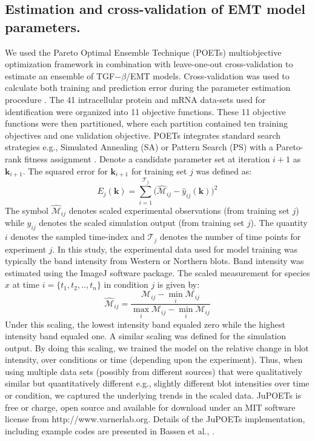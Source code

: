 \subsection*{Estimation and cross-validation of EMT model parameters.}
We used the Pareto Optimal Ensemble Technique (POETs) multiobjective optimization framework in combination with leave-one-out cross-validation to estimate an ensemble of TGF$-\beta$/EMT models.
Cross-validation was used to calculate both training and prediction error during the parameter estimation procedure \cite{kohavi1995study}.
The 41 intracellular protein and mRNA data-sets used for identification were organized into 11 objective functions.
These 11 objective functions were then partitioned, where each partition contained ten training objectives and one validation objective.
POETs integrates standard search strategies e.g., Simulated Annealing (SA) or Pattern Search (PS)
with a Pareto-rank fitness assignment \cite{Song:2010fk,JuPOETs-BioArXiv}.
Denote a candidate parameter set at iteration $i+1$ as $\mathbf{k}_{i+1}$.
The squared error for $\mathbf{k}_{i+1}$ for training set $j$ was defined as:
\begin{equation}\label{eqn_cost2}
	E_{j}(\mathbf{k}) = \sum_{i=1}^{\mathcal{T}_{j}}\biggl(\hat{\mathcal{M}}_{ij}-\hat{y}_{ij}(\mathbf{k})\biggr)^2
\end{equation}
The symbol $\hat{\mathcal{M}}_{ij}$ denotes scaled experimental observations (from training set $j$) while $\hat{y}_{ij}$ denotes the scaled simulation output (from training set $j$).
The quantity $i$ denotes the sampled time-index and $\mathcal{T}_{j}$ denotes the number of time points for experiment $j$.
In this study, the experimental data used for model training was typically the band intensity from Western or Northern blots.
Band intensity was estimated using the ImageJ software package.
The scaled measurement for species $x$ at time $i=\{t_{1},t_{2},..,t_{n}\}$ in condition $j$ is given by:
\begin{equation}\label{norm_exp_data}
\hat{\mathcal{M}}_{ij} = \frac{\mathcal{M}_{ij} - \min_{i}\mathcal{M}_{ij}}{\max_{i}{\mathcal{M}_{ij}}-\min_{i}{\mathcal{M}_{ij}}}
\end{equation}
Under this scaling, the lowest intensity band equaled zero while the highest intensity band equaled one.
A similar scaling was defined for the simulation output. By doing this scaling, we trained the model on the relative change in blot intensity, over conditions or time (depending upon the experiment). Thus, when using multiple data sets (possibly from different sources) that were qualitatively similar but quantitatively different e.g., slightly different blot intensities over time or condition, we captured the underlying trends in the scaled data.
JuPOETs is free or charge, open source and available for download under an MIT software license from http://www.varnerlab.org.
Details of the JuPOETs implementation, including example codes are presented in Bassen et al., \cite{JuPOETs-BioArXiv}.

